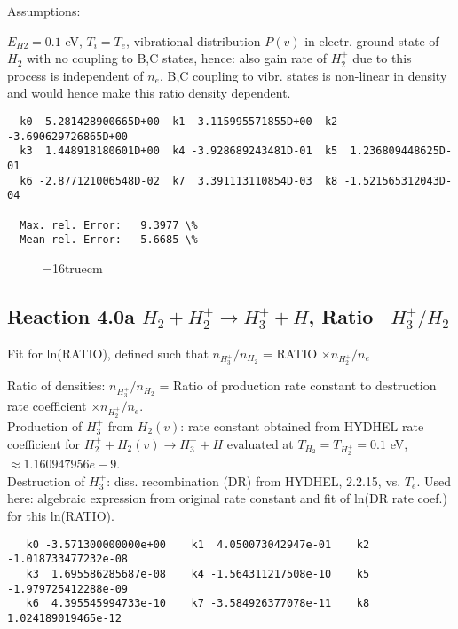 \documentclass[12pt,dvipdfmx]{article}
\begin{document}
Assumptions:

$E_{H2} = 0.1$ eV, $T_i = T_e$, vibrational distribution $P(v)$ in electr. ground state of $H_2$ with
no coupling to B,C states,
hence: also gain rate of $H_2^+$ due to this process is independent of $n_e$.
B,C coupling to vibr. states is non-linear in density and would hence make this ratio density dependent.

\begin{small}\begin{verbatim}
  k0 -5.281428900665D+00  k1  3.115995571855D+00  k2 -3.690629726865D+00
  k3  1.448918180601D+00  k4 -3.928689243481D-01  k5  1.236809448625D-01
  k6 -2.877121006548D-02  k7  3.391113110854D-03  k8 -1.521565312043D-04

  Max. rel. Error:   9.3977 \%
  Mean rel. Error:   5.6685 \%
\end{verbatim}\end{small}


\begin{figure} \label{2.0a}
\epsfxsize=16truecm
\end{figure}

\newpage
\subsection{
Reaction 4.0a   $ H_2 + H_2^+ \rightarrow H_3^+ + H$, Ratio \ $H_3^+/H_2$
}

Fit for ln(RATIO), defined such that $n_{H_3^+}/n_{H_2}$ = RATIO $\times n_{H_2^+}/n_e$

 Ratio of densities: $n_{H_3^+}/n_{H_2}$ = Ratio of production rate constant
 to destruction rate coefficient $\times n_{H_2^+}/n_e$. \\
  Production of $H_3^+$ from $H_2(v)$:  rate constant obtained from HYDHEL rate coefficient
  for $ H_2^+ + H_2(v) \rightarrow H_3^+ + H$
  evaluated at $T_{H_2} = T_{H_2^+} = 0.1$ eV,  $ \approx 1.160947956 e-9$. \\
  Destruction of $H_3^+$: diss. recombination (DR) from HYDHEL, 2.2.15, vs. $T_e$.
  Used here: algebraic expression from original rate constant and fit of ln(DR rate coef.)
  for this ln(RATIO).

\begin{small}\begin{verbatim}
   k0 -3.571300000000e+00    k1  4.050073042947e-01    k2 -1.018733477232e-08
   k3  1.695586285687e-08    k4 -1.564311217508e-10    k5 -1.979725412288e-09
   k6  4.395545994733e-10    k7 -3.584926377078e-11    k8  1.024189019465e-12
\end{verbatim}\end{small}
\newpage
\end{document}
